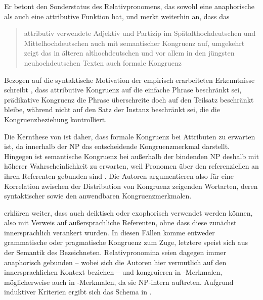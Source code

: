 Er betont den Sonderstatus des Relativpronomens, das sowohl
eine anaphorische als auch eine attributive Funktion
hat, und merkt weiterhin an, dass das
\blockcquote[194]{fleischer2012}{attributiv verwendete
Adjektiv und Partizip \textelp{} im
Spätalthochdeutschen und
Mittelhochdeutschen auch mit semantischer
Kongruenz auf, umgekehrt zeigt das
 in älteren althochdeutschen und vor
allem in den jüngsten neuhochdeutschen Texten auch formale
Kongruenz}.

Bezogen auf die syntaktische Motivation der empirisch erarbeiteten Erkenntnisse
schreibt \citet[216]{corbett1979}, dass attributive
Kongruenz auf die einfache Phrase beschränkt sei,
prädikative Kongruenz die Phrase überschreite doch
auf den Teilsatz beschränkt bleibe, während  nicht auf
den Satz der Instanz beschränkt sei, die die
Kongruenzbeziehung kontrolliert.

Die Kernthese von \citet{wechslerzlatic2003} ist daher, dass formale
Kongruenz bei Attributen zu erwarten ist, da
innerhalb der NP  das entscheidende
Kongruenzmerkmal darstellt. Hingegen ist semantische
Kongruenz bei  außerhalb der
bindenden NP deshalb mit höherer Wahrscheinlichkeit zu erwarten, weil Pronomen
über den referenziellen  an ihren Referenten gebunden sind
\autocite[89--91]{wechslerzlatic2003}. Die Autoren argumentieren also für eine
Korrelation zwischen der Distribution von
Kongruenz zeigenden Wortarten, deren syntaktischer  sowie den
anwendbaren Kongruenz\-merkmalen.

\citet[89]{wechslerzlatic2003} erklären weiter, dass 
auch deiktisch oder exophorisch verwendet werden können, also mit Verweis auf
außersprachliche Referenten, ohne dass diese zunächst innersprachlich
verankert wurden. In diesen Fällen komme entweder grammatische
oder pragmatische Kongruenz zum Zuge, letztere speist sich aus
der Semantik des Bezeichneten. Relativpronomina seien dagegen immer
anaphorisch gebunden -- wobei sich die Autoren hier vermutlich auf
den innersprachlichen Kontext beziehen -- und kongruieren in
-Merkmalen, möglicherweise auch in -Merkmalen, da sie
NP-intern auftreten. Aufgrund
induktiver Kriterien ergibt sich das Schema in .

